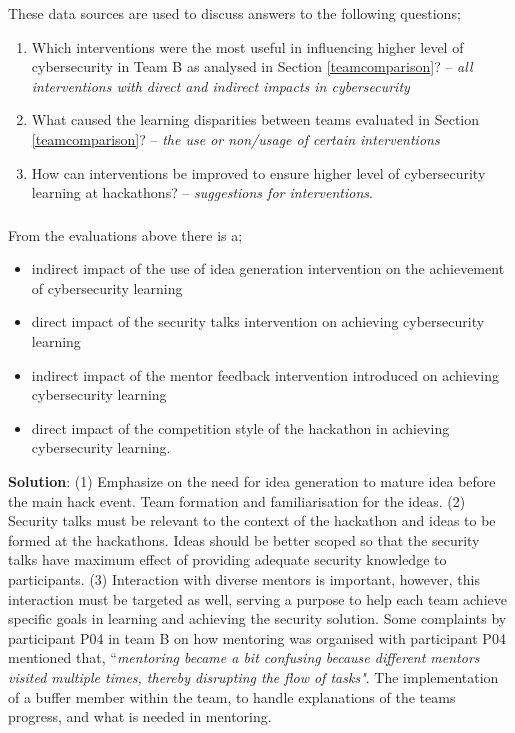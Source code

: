 These data sources are used to discuss answers to the following questions;
\begin{enumerate}
    \item Which interventions were the most useful in influencing higher level of cybersecurity in Team B as analysed in Section \ref{teamcomparison}? -- \textit{all interventions with direct and indirect impacts in cybersecurity}
    \item What caused the learning disparities between teams evaluated in Section \ref{teamcomparison}? -- \textit{the use or non/usage of certain interventions}
    \item How can interventions be improved to ensure higher level of cybersecurity learning at hackathons? -- \textit{suggestions for interventions}.
\end{enumerate}

\subsubsection{}From the evaluations above there is a;
\begin{itemize}
    \item indirect impact of the use of idea generation intervention on the achievement of cybersecurity learning
    \item direct impact of the security talks intervention on achieving cybersecurity learning
    \item indirect impact of the mentor feedback intervention introduced on achieving cybersecurity learning
    \item direct impact of the competition style of the hackathon in achieving cybersecurity learning.
\end{itemize}

\textbf{Solution}: (1) Emphasize on the need for idea generation to mature idea before the main hack event. Team formation and familiarisation for the ideas. (2) Security talks must be relevant to the context of the hackathon and ideas to be formed at the hackathons. Ideas should be better scoped so that the security talks have maximum effect of providing adequate security knowledge to participants. (3) Interaction with diverse mentors is important, however, this interaction must be targeted as well, serving a purpose to help each team achieve specific goals in learning and achieving the security solution. Some complaints by participant P04 in team B on how mentoring was organised with participant P04 mentioned that, ``\textit{mentoring became a bit confusing because different mentors visited multiple times, thereby disrupting the flow of tasks"}. The implementation of a buffer member within the team, to handle explanations of the teams progress, and what is needed in mentoring.


